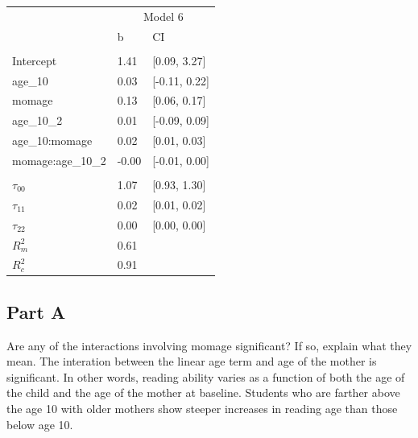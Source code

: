 \documentclass[]{article}
\begin{document}
\begin{table}[H]
\centering
\begin{tabular}{lll}
\toprule
\multicolumn{1}{c}{ } & \multicolumn{2}{c}{Model 6} \\
\cmidrule(l{2pt}r{2pt}){2-3}
 & b & CI\\
\midrule
\addlinespace[0.3em]
\multicolumn{3}{l}{\textbf{Fixed}}\\
\hspace{1em}Intercept & 1.41 & [0.09, 3.27]\\
\hspace{1em}age\_10 & 0.03 & [-0.11, 0.22]\\
\hspace{1em}momage & 0.13 & [0.06, 0.17]\\
\hspace{1em}age\_10\_2 & 0.01 & [-0.09, 0.09]\\
\hspace{1em}age\_10:momage & 0.02 & [0.01, 0.03]\\
\hspace{1em}momage:age\_10\_2 & -0.00 & [-0.01, 0.00]\\
\addlinespace[0.3em]
\multicolumn{3}{l}{\textbf{Random}}\\
\hspace{1em}$\tau_{00}$ & 1.07 & [0.93, 1.30]\\
\hspace{1em}$\tau_{11}$ & 0.02 & [0.01, 0.02]\\
\hspace{1em}$\tau_{22}$ & 0.00 & [0.00, 0.00]\\
$R^2_m$ & 0.61 & \\
$R^2_c$ & 0.91 & \\
\bottomrule
\end{tabular}
\end{table}

\subsection{Part A}\label{part-a-3}

Are any of the interactions involving momage significant? If so, explain
what they mean. The interation between the linear age term and age of
the mother is significant. In other words, reading ability varies as a
function of both the age of the child and the age of the mother at
baseline. Students who are farther above the age 10 with older mothers
show steeper increases in reading age than those below age 10.
\end{document}
